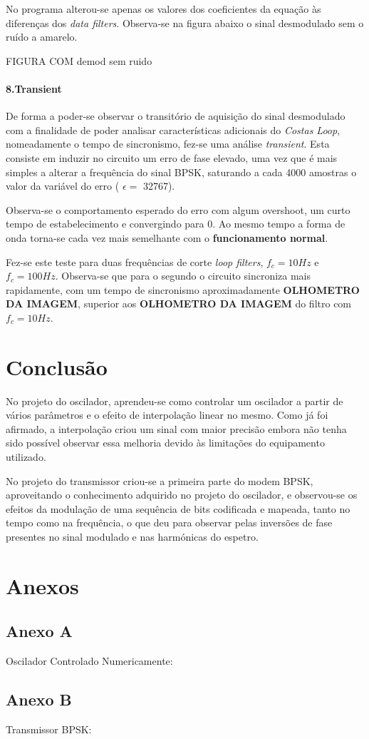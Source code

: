 \documentclass[11pt]{article}
\numberwithin{equation}{section}
\begin{document}
No programa alterou-se apenas os valores dos coeficientes da equação às diferenças dos \textit{data filters}.
Observa-se na figura abaixo o sinal desmodulado sem o ruído a amarelo.

FIGURA COM demod sem ruido
\paragraph{8.Transient} \hspace{0pt}

De forma a poder-se observar o transitório de aquisição do sinal desmodulado com a finalidade de poder analisar características adicionais do \textit{Costas Loop}, nomeadamente o tempo de sincronismo, fez-se uma análise \textit{transient}. Esta consiste em induzir no circuito um erro de fase elevado, uma vez que é mais simples a alterar a frequência do sinal BPSK, saturando a cada 4000 amostras o valor da variável do erro ( $\epsilon=$ 32767). 

Observa-se o comportamento esperado do erro com algum overshoot, um curto tempo de estabelecimento e convergindo para 0. Ao mesmo tempo a forma de onda torna-se cada vez mais semelhante com o \textbf{funcionamento normal}.%

Fez-se este teste para duas frequências de corte \textit{loop filters}, $f_c = 10Hz$ e $f_c = 100Hz$. Observa-se que para o segundo o circuito sincroniza mais rapidamente, com um tempo de sincronismo aproximadamente \textbf{OLHOMETRO DA IMAGEM}, superior aos \textbf{OLHOMETRO DA IMAGEM} do filtro com $f_c = 10Hz$.



\section{Conclusão}


No projeto do oscilador, aprendeu-se como controlar um oscilador a partir de vários parâmetros e o efeito de interpolação linear no mesmo. Como já foi afirmado, a interpolação criou um sinal com maior precisão embora não tenha sido possível observar essa melhoria devido às limitações do equipamento utilizado.

 No projeto do transmissor criou-se a primeira parte do modem BPSK, aproveitando o conhecimento adquirido no projeto do oscilador, e observou-se os efeitos da modulação de uma sequência de bits codificada e mapeada, tanto no tempo como na frequência, o que deu para observar pelas inversões de fase presentes no sinal modulado e nas harmónicas do espetro.

\section{Anexos}
\subsection{Anexo A}
Oscilador Controlado Numericamente:


\subsection{Anexo B}
Transmissor BPSK:

	
\end{document}
